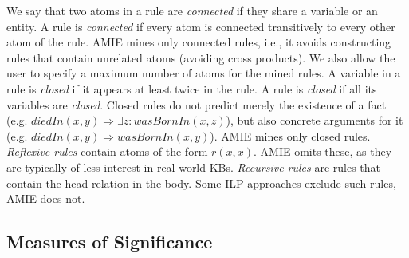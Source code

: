 We say that two atoms in a rule are \emph{connected} if they share a variable or an entity.
A rule is \emph{connected} if every atom is connected transitively to every other atom of the rule.
AMIE mines only connected rules, i.e., it avoids constructing rules that contain unrelated atoms (avoiding cross products).
We also allow the user to specify a maximum number of atoms for the mined rules.
A variable in a rule is \emph{closed} if it appears at least twice in the rule. A rule is \emph{closed} if all its variables are \emph{closed}.
Closed rules do not predict merely the existence of a fact (e.g. $diedIn(x,y)\Rightarrow \exists z:wasBornIn(x,z)$),
but also concrete arguments for it (e.g. $diedIn(x,y)\Rightarrow wasBornIn(x,y)$). AMIE mines only closed rules.
\emph{Reflexive rules} contain atoms of the form $r(x, x)$. AMIE omits these, as they are typically of less interest in real world KBs.
\emph{Recursive rules} are rules that contain the head relation in the body. Some ILP approaches exclude such rules, AMIE does not.
%

\subsection{Measures of Significance} \label{subsec:statSignificance}

